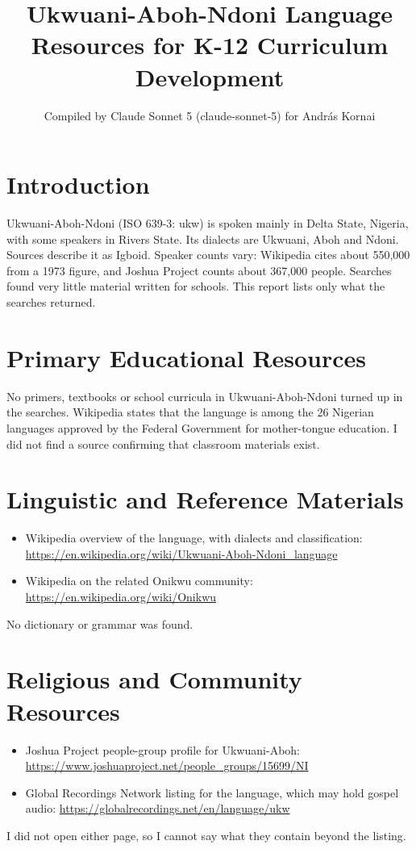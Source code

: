 \documentclass[12pt]{article}
\title{Ukwuani-Aboh-Ndoni Language Resources for K-12 Curriculum Development}
\author{Compiled by Claude Sonnet 5 (claude-sonnet-5) for Andr\'as Kornai}
\date{}
\begin{document}
\maketitle

\section{Introduction}
Ukwuani-Aboh-Ndoni (ISO 639-3: ukw) is spoken mainly in Delta State, Nigeria, with some speakers in Rivers State. Its dialects are Ukwuani, Aboh and Ndoni. Sources describe it as Igboid. Speaker counts vary: Wikipedia cites about 550,000 from a 1973 figure, and Joshua Project counts about 367,000 people. Searches found very little material written for schools. This report lists only what the searches returned.

\section{Primary Educational Resources}
No primers, textbooks or school curricula in Ukwuani-Aboh-Ndoni turned up in the searches. Wikipedia states that the language is among the 26 Nigerian languages approved by the Federal Government for mother-tongue education. I did not find a source confirming that classroom materials exist.

\section{Linguistic and Reference Materials}
\begin{itemize}
\item Wikipedia overview of the language, with dialects and classification: \url{https://en.wikipedia.org/wiki/Ukwuani-Aboh-Ndoni_language}
\item Wikipedia on the related Onikwu community: \url{https://en.wikipedia.org/wiki/Onikwu}
\end{itemize}
No dictionary or grammar was found.

\section{Religious and Community Resources}
\begin{itemize}
\item Joshua Project people-group profile for Ukwuani-Aboh: \url{https://www.joshuaproject.net/people_groups/15699/NI}
\item Global Recordings Network listing for the language, which may hold gospel audio: \url{https://globalrecordings.net/en/language/ukw}
\end{itemize}
I did not open either page, so I cannot say what they contain beyond the listing.
\end{document}
